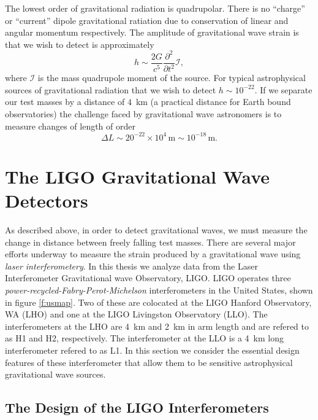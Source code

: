 The lowest order of gravitational radiation is quadrupolar. There is no
``charge'' or ``current'' dipole gravitational ratiation due to conservation
of linear and angular momentum respectively. The amplitude of gravitational
wave strain is that we wish to detect is approximately\cite{thorne.k:1987}
\begin{equation}
h \sim \frac{2G}{c^5} \frac{\partial^2}{\partial t^2} \mathcal{I},
\end{equation}
where $\mathcal{I}$ is the mass quadrupole moment of the source. For typical
astrophysical sources of gravitational radiation that we wish to detect $h
\sim 10^{-22}$. If we separate our test masses by a distance of $4$~km (a
practical distance for Earth bound observatories) the challenge faced by
gravitational wave astronomers is to measure changes of length of order
\begin{equation}
\Delta L \sim 20^{-22} \times 10^4\,\mathrm{m} \sim 10^{-18}\,\mathrm{m}.
\end{equation}

\section{The LIGO Gravitational Wave Detectors}
\label{s:ifos}

As described above, in order to detect gravitational waves, we must measure
the change in distance between freely falling test masses. There are several
major efforts underway\cite{ligo,geo,virgo} to measure the strain produced by
a gravitational wave using \emph{laser interferometery}. In this thesis we
analyze data from the Laser Interferometer Gravitational wave Observatory,
LIGO. LIGO operates three \emph{power-recycled-Fabry-Perot-Michelson}
interferometers in the United States, shown in figure \ref{f:usmap}. Two of
these are colocated at the LIGO Hanford Observatory, WA (LHO) and one at the
LIGO Livingston Observatory (LLO). The interferometers at the LHO are 4~km and
2~km in arm length and are refered to as H1 and H2, respectively. The
interferometer at the LLO is a 4~km long interferometer refered to as L1.  In
this section we consider the essential design features of these interferometer
that allow them to be sensitive astrophysical gravitational wave sources.

\subsection{The Design of the LIGO Interferometers}
\label{ss:ligoifos}

